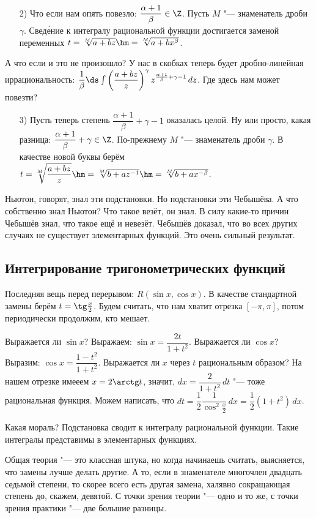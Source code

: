 \documentclass[a4paper,10pt,twoside]{article}
\begin{document}
 \begin{itemize}
   \item [2)] Что если нам опять повезло: $\dfrac{\alpha+1}\beta\in\Z$. Пусть $M$ "--- знаменатель дроби $\gamma$. Свед\'{е}ние к интегралу
   рациональной функции достигается заменой переменных $t=\sqrt[M]{a+bz}\hm=\sqrt[M]{a+bx^\beta}$.
 \end{itemize} 
 
 А что если и это не произошло? У нас в скобках теперь будет дробно-линейная иррациональность: 
 $\dfrac1\beta\ds\int\left(\dfrac{a+bz}{z}\right)^{\gamma}z^{\frac{\alpha+1}\beta+\gamma-1}\,dz$. Где здесь нам может повезти?
 
 \begin{itemize}
   \item [3)] Пусть теперь степень $\dfrac{\alpha+1}\beta+\gamma-1$ оказалась целой. Ну или просто, какая разница: $\dfrac{\alpha+1}\beta+\gamma\in\Z$.
   По-прежнему $M$ "--- знаменатель дроби $\gamma$. В качестве новой буквы берём $t=\sqrt[M]{\dfrac{a+bz}z}\hm=\sqrt[M]{b+az^{-1}}\hm=
   \sqrt[M]{b+ax^{-\beta}}$.
 \end{itemize}
 
 Ньютон, говорят, знал эти подстановки. Но подстановки эти Чебышёва. А что собственно знал Ньютон? Что такое везёт, он знал. В силу
 какие-то причин Чебышёв знал, что такое ещё и невезёт. Чебышёв доказал, что во всех других случаях не существует элементарных функций.
 Это очень сильный результат.
 
 \subsection{Интегрирование тригонометрических функций}
 Последняя вещь перед перерывом: $R(\sin x,\cos x)$. В качестве стандартной замены берём $t=\tg\frac x2$. Будем считать, что
 нам хватит отрезка $\left[-\pi,\pi\right]$, потом периодически продолжим, кто мешает.
 
 Выражается ли $\sin x$? Выражаем: $\sin x=\dfrac{2t}{1+t^2}$. Выражается ли $\cos x$? Выразим: $\cos x=\dfrac{1-t^2}{1+t^2}$.
 Выражается ли $x$ через $t$ рациональным образом? На нашем отрезке имееем $x=2\arctg t$, значит, $dx=\dfrac{2}{1+t^2}\,dt$ "--- тоже
 рациональная функция. Можем написать, что $dt=\dfrac12\dfrac1{\cos^2\frac x2}\,dx=\dfrac12(1+t^2)\,dx$.
 
 Какая мораль? Подстановка сводит к интегралу рациональной функции. Такие интегралы представимы в элементарных функциях.
 
 Общая теория "--- это классная штука, но когда начинаешь считать, выясняется, что замены лучше делать другие. А то, если в знаменателе многочлен
 двадцать седьмой степени, то скорее всего есть другая замена, халявно сокращающая степень до, скажем, девятой. С точки зрения теории "--- одно и то же,
 с точки зрения практики "--- две большие разницы.
 
\end{document}
